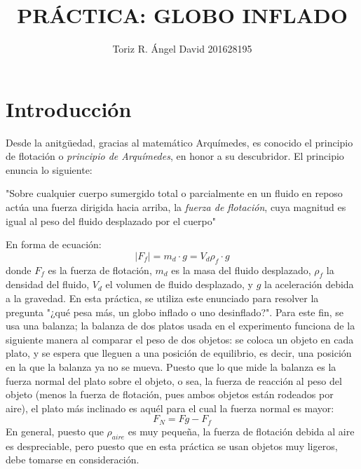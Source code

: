 \documentclass[12pt]{article}
\begin{document}
\title{PRÁCTICA: GLOBO INFLADO}
\author{Toriz R. Ángel David 201628195}



\section{Introducci\'on}
Desde la anitgüedad, gracias al matemático Arquímedes, es conocido el principio de flotación o \emph{principio de Arquímedes}, en honor a su descubridor. El principio enuncia lo siguiente:
\begin{center}
    "Sobre cualquier cuerpo sumergido total o parcialmente en un fluido en reposo actúa una fuerza dirigida hacia arriba, la \emph{fuerza de flotación}, cuya magnitud es igual al peso del fluido desplazado por el cuerpo"\cite{pda:1}
\end{center}
En forma de ecuación:
\begin{equation}
    |F_{f}|=m_{d}\cdot g=V_{d}\rho_{f}\cdot g
\end{equation}
donde $F_{f}$ es la fuerza de flotación, $m_{d}$ es la masa del fluido desplazado, $\rho_{f}$ la densidad del fluido, $V_{d}$ el volumen de fluido desplazado, y $g$ la aceleración debida a la gravedad.
En esta práctica, se utiliza este enunciado para resolver la pregunta "¿qué pesa más, un globo inflado o uno desinflado?". Para este fin, se usa una balanza; la balanza de dos platos usada en el experimento funciona de la siguiente manera al comparar el peso de dos objetos: se coloca un objeto en cada plato, y se espera que lleguen a una posición de equilibrio, es decir, una posición en la que la balanza ya no se mueva. Puesto que lo que mide la balanza es la fuerza normal del plato sobre el objeto, o sea, la fuerza de reacción al peso del objeto (menos la fuerza de flotación, pues ambos objetos están rodeados por aire), el plato más inclinado es aquél para el cual la fuerza normal es mayor:
\begin{equation} \label{eq:2}
    F_{N}=F{g}-F_{f}
\end{equation}
En general, puesto que $\rho_{aire}$ es muy pequeña, la fuerza de flotación debida al aire es despreciable, pero puesto que en esta práctica se usan objetos muy ligeros, debe tomarse en consideración.
\end{document}
